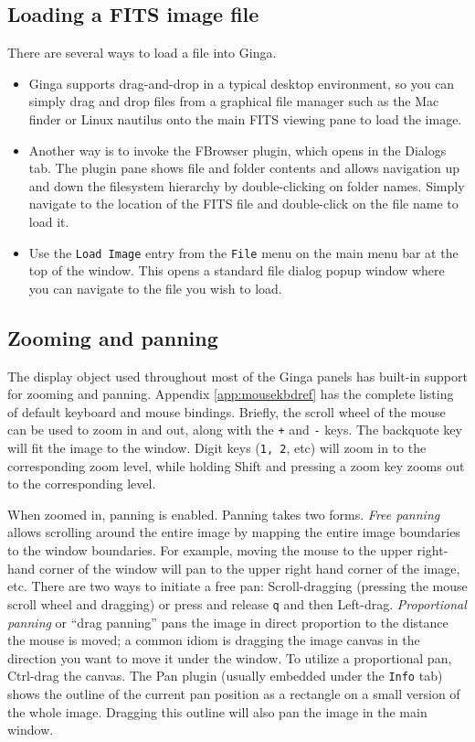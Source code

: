\documentclass[11pt]{report}
\begin{document}
\subsection{Loading a FITS image file}
There are several ways to load a file into Ginga.
\begin{itemize}
\item Ginga supports drag-and-drop in a typical desktop environment, so
  you can simply drag and drop files from a graphical file manager such
  as the Mac finder or Linux nautilus onto the main FITS viewing pane to
 load the image.
\item Another way is to invoke the FBrowser plugin, which opens in the Dialogs
 tab.  The plugin pane shows file and folder contents and allows
 navigation up and down the filesystem hierarchy by double-clicking on
 folder names.   Simply navigate to the location of the FITS file and
 double-click on the file name to load it.
\item Use the {\tt Load Image} entry from the {\tt File} menu on
  the main menu bar at the top of the window.  This opens a standard file
  dialog popup window where you can navigate to the file you wish to load.
\end{itemize}

\subsection{Zooming and panning}
The display object used throughout most of the Ginga panels has built-in
support for zooming and panning.  Appendix \ref{app:mousekbdref} has the
complete listing of default keyboard and mouse bindings.  
Briefly, the scroll wheel of the mouse can be used to zoom in and out,
along with the {\tt +} and {\tt -} keys.  The backquote key will fit the
image to the window.  Digit keys ({\tt 1, 2}, etc) will zoom in to the
corresponding zoom level, while holding Shift and pressing a zoom key
zooms out to the corresponding level.

When zoomed in, panning is enabled.  Panning takes two forms.
\emph{Free panning} allows scrolling around the entire image by mapping
the entire image boundaries to the window boundaries.  For example,
moving the mouse to the upper right-hand corner of the window will pan to
the upper right hand corner of the image, etc.  There are two ways to
initiate a free pan: Scroll-dragging (pressing the mouse scroll wheel
and dragging) or press and release {\tt q} and then Left-drag.
\emph{Proportional panning} or ``drag panning'' pans the image in direct
proportion to the distance the mouse is moved; a common idiom is
dragging the image canvas in the direction you want to move it under the
window.  To utilize a proportional pan, Ctrl-drag the canvas.  The Pan
plugin (usually embedded under the {\tt Info} tab) shows the outline of
the current pan position as a rectangle on a small version of the whole
image.  Dragging this outline will also pan the image in the main window.
\end{document}
